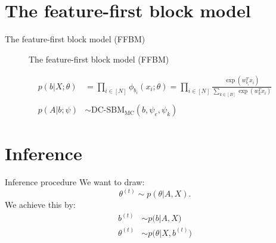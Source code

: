 \documentclass{beamer}
\begin{document}
	\section{The feature-first block model}
	\begin{frame}{The feature-first block model (FFBM)}
		\begin{figure}[!h]
			\centering
			\caption{The feature-first block model (FFBM)}
			\label{fig:ffbm}
		\end{figure}
	
		\begin{align}
			p(b|X; \theta) &= \prod_{i \in [N]} \phi_{b_i} (x_i; \theta)
			= \prod_{i \in [N]} \frac{\exp (w_{b_i}^T x_i)}{\sum_{k \in [B]} \exp (w_k^T x_i) } \\ \nonumber \\
			p(A|b; \psi) &\sim \textrm{DC-SBM}_{\textrm{MC}} (b, \psi_e, \psi_k)
		\end{align}
	\end{frame}

	\section{Inference}
	\begin{frame}{Inference procedure}
		We want to draw:
		\begin{equation}
			\theta^{(t)} \sim p(\theta| A, X).
		\end{equation}
		We achieve this by:
		\begin{align}
			b^{(t)} &\sim p \Big( b| A, X \Big) \\
			\theta^{(t)} &\sim p \Big( \theta| X, b^{(t)} \Big)
		\end{align}
	\end{frame}
	
\end{document}
